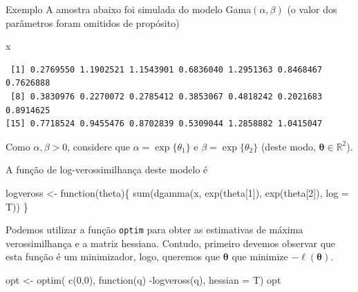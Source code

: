 \documentclass[
  letterpaper,
  DIV=11,
  numbers=noendperiod]{scrreprt}
\newenvironment{Shaded}{\begin{snugshade}}{\end{snugshade}}
\newcommand{\AttributeTok}[1]{\textcolor[rgb]{0.40,0.45,0.13}{#1}}
\newcommand{\ControlFlowTok}[1]{\textcolor[rgb]{0.00,0.23,0.31}{#1}}
\newcommand{\DecValTok}[1]{\textcolor[rgb]{0.68,0.00,0.00}{#1}}
\newcommand{\FunctionTok}[1]{\textcolor[rgb]{0.28,0.35,0.67}{#1}}
\newcommand{\NormalTok}[1]{\textcolor[rgb]{0.00,0.23,0.31}{#1}}
\newcommand{\OtherTok}[1]{\textcolor[rgb]{0.00,0.23,0.31}{#1}}
\newcommand{\SpecialCharTok}[1]{\textcolor[rgb]{0.37,0.37,0.37}{#1}}
\theoremstyle{definition}
\theoremstyle{definition}
\theoremstyle{remark}
\begin{document}
Exemplo A amostra abaixo foi simulada do modelo Gama\((\alpha,\beta)\)
(o valor dos parâmetros foram omitidos de propósito)

\begin{Shaded}
\begin{Highlighting}[]
\NormalTok{x}
\end{Highlighting}
\end{Shaded}

\begin{verbatim}
 [1] 0.2769550 1.1902521 1.1543901 0.6836040 1.2951363 0.8468467 0.7626888
 [8] 0.3830976 0.2270072 0.2785412 0.3853067 0.4818242 0.2021683 0.8914625
[15] 0.7718524 0.9455476 0.8702839 0.5309044 1.2858882 1.0415047
\end{verbatim}

Como \(\alpha,\beta>0\), considere que \(\alpha=\exp\{\theta_1\}\) e
\(\beta=\exp\{\theta_2\}\) (deste modo,
\(\boldsymbol{\theta}\in\mathbb{R}^2\)).

A função de log-verossimilhança deste modelo é

\begin{Shaded}
\begin{Highlighting}[]
\NormalTok{logveross }\OtherTok{\textless{}{-}} \ControlFlowTok{function}\NormalTok{(theta)\{ }\FunctionTok{sum}\NormalTok{(}\FunctionTok{dgamma}\NormalTok{(x, }\FunctionTok{exp}\NormalTok{(theta[}\DecValTok{1}\NormalTok{]), }\FunctionTok{exp}\NormalTok{(theta[}\DecValTok{2}\NormalTok{]), }\AttributeTok{log =}\NormalTok{ T))}
\NormalTok{\}}
\end{Highlighting}
\end{Shaded}

Podemos utilizar a função \texttt{optim} para obter as estimativas de
máxima verossimilhança e a matriz hessiana. Contudo, primeiro devemos
observar que esta função é um minimizador, logo, queremos que
\(\boldsymbol{\theta}\) que minimize \(-\ell({\boldsymbol{\theta}})\).

\begin{Shaded}
\begin{Highlighting}[]
\NormalTok{opt }\OtherTok{\textless{}{-}} \FunctionTok{optim}\NormalTok{( }\FunctionTok{c}\NormalTok{(}\DecValTok{0}\NormalTok{,}\DecValTok{0}\NormalTok{), }\ControlFlowTok{function}\NormalTok{(q) }\SpecialCharTok{{-}}\FunctionTok{logveross}\NormalTok{(q), }\AttributeTok{hessian =}\NormalTok{ T)}
\NormalTok{opt}
\end{Highlighting}
\end{Shaded}
\end{document}
